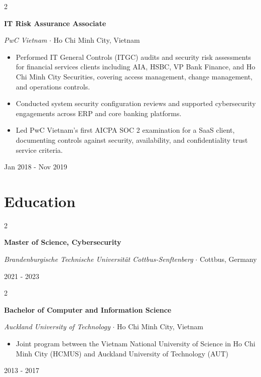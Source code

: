 \documentclass[10pt, letterpaper]{article}
\newenvironment{highlights}{
    \begin{itemize}[
        topsep=0.08 cm,
        parsep=0.08 cm,
        partopsep=0pt,
        itemsep=0.05 cm,
        leftmargin=0 cm + 12pt
    ]
}{
    \end{itemize}
}
\newenvironment{twocolentry}[2][]{
    \onecolentry
    \def\secondColumn{#2}
    \setcolumnwidth{\fill, 4.8 cm}
    \begin{paracol}{2}
}{
    \switchcolumn \raggedleft \color{primaryColor}\small\secondColumn
    \end{paracol}
    \endonecolentry
}
\begin{document}
    \begin{twocolentry}{
        Jan 2018 - Nov 2019
    }
        \textbf{\color{primaryColor}IT Risk Assurance Associate}

        \textit{PwC Vietnam} $\cdot$ Ho Chi Minh City, Vietnam

        \begin{highlights}
            \item Performed IT General Controls (ITGC) audits and security risk assessments for financial services clients including AIA, HSBC, VP Bank Finance, and Ho Chi Minh City Securities, covering access management, change management, and operations controls.
            \item Conducted system security configuration reviews and supported cybersecurity engagements across ERP and core banking platforms.
            \item Led PwC Vietnam's first AICPA SOC 2 examination for a SaaS client, documenting controls against security, availability, and confidentiality trust service criteria.
        \end{highlights}
    \end{twocolentry}

    \vspace{0.15 cm}

    \section{Education}

    \begin{twocolentry}{
        2021 - 2023
    }
        \textbf{\color{primaryColor}Master of Science, Cybersecurity}

        \textit{Brandenburgische Technische Universität Cottbus-Senftenberg} $\cdot$ Cottbus, Germany
    \end{twocolentry}

    \vspace{0.15 cm}

    \begin{twocolentry}{
        2013 - 2017
    }
        \textbf{\color{primaryColor}Bachelor of Computer and Information Science}

        \textit{Auckland University of Technology} $\cdot$ Ho Chi Minh City, Vietnam

        \begin{highlights}
            \item Joint program between the Vietnam National University of Science in Ho Chi Minh City (HCMUS) and Auckland University of Technology (AUT)
        \end{highlights}
    \end{twocolentry}
\end{document}
